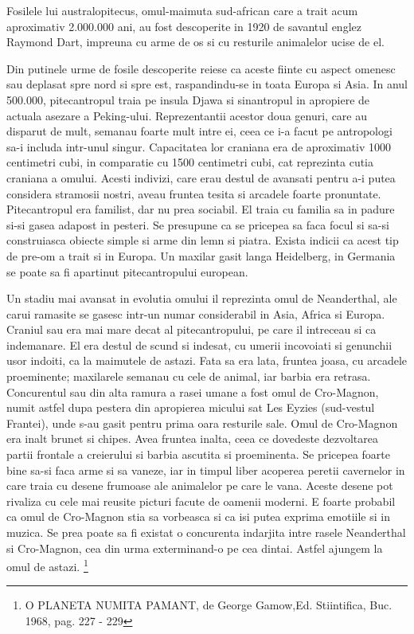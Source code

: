 Fosilele lui australopitecus, omul-maimuta sud-african care a trait acum aproximativ 2.000.000 ani, au fost descoperite in 1920 de savantul englez Raymond Dart, impreuna cu arme de os si cu resturile animalelor ucise de el.

Din putinele urme de fosile descoperite reiese ca aceste fiinte cu aspect omenesc sau deplasat spre nord si spre est, raspandindu-se in toata Europa si Asia. In anul 500.000, pitecantropul traia pe insula Djawa si sinantropul in apropiere de actuala asezare a Peking-ului. Reprezentantii acestor doua genuri, care au disparut de mult, semanau foarte mult intre ei, ceea ce i-a facut pe antropologi sa-i includa intr-unul singur. Capacitatea lor craniana era de aproximativ 1000 centimetri cubi, in comparatie cu 1500 centimetri cubi, cat reprezinta cutia craniana a omului. Acesti indivizi, care erau destul de avansati pentru a-i putea considera stramosii nostri, aveau fruntea tesita si arcadele foarte pronuntate. Pitecantropul era familist, dar nu prea sociabil. El traia cu familia sa in padure si-si gasea adapost in pesteri. Se presupune ca se pricepea sa faca focul si sa-si construiasca obiecte simple si arme din lemn si piatra. Exista indicii ca acest tip de pre-om a trait si in Europa. Un maxilar gasit langa Heidelberg, in Germania se poate sa fi apartinut pitecantropului european.

Un stadiu mai avansat in evolutia omului il reprezinta omul de Neanderthal, ale carui ramasite se gasesc intr-un numar considerabil in Asia, Africa si Europa. Craniul sau era mai mare decat al pitecantropului, pe care il intreceau si ca indemanare. El era destul de scund si indesat, cu umerii incovoiati si genunchii usor indoiti, ca la maimutele de astazi. Fata sa era lata, fruntea joasa, cu arcadele proeminente; maxilarele semanau cu cele de animal, iar barbia era retrasa. Concurentul sau din alta ramura a rasei umane a fost omul de Cro-Magnon, numit astfel dupa pestera din apropierea micului sat Les Eyzies (sud-vestul Frantei), unde s-au gasit pentru prima oara resturile sale. Omul de Cro-Magnon era inalt brunet si chipes. Avea fruntea inalta, ceea ce dovedeste dezvoltarea partii frontale a creierului si barbia ascutita si proeminenta. Se pricepea foarte bine sa-si faca arme si sa vaneze, iar in timpul liber acoperea peretii cavernelor in care traia cu desene frumoase ale animalelor pe care le vana. Aceste desene pot rivaliza cu cele mai reusite picturi facute de oamenii moderni. E foarte probabil ca omul de Cro-Magnon stia sa vorbeasca si ca isi putea exprima emotiile si in muzica. Se prea poate sa fi existat o concurenta indarjita intre rasele Neanderthal si Cro-Magnon, cea din urma exterminand-o pe cea dintai. Astfel ajungem la omul de astazi. \footnote{O PLANETA NUMITA PAMANT, de George Gamow,Ed. Stiintifica, Buc. 1968, pag. 227 - 229} 

